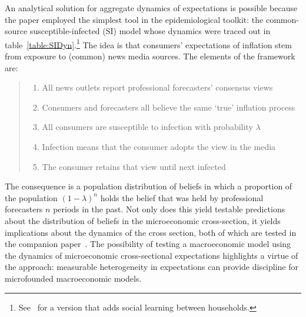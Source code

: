 
An analytical solution for aggregate dynamics of expectations is possible because the paper employed the simplest tool in the epidemiological toolkit: the common-source susceptible-infected (SI) model whose dynamics were traced out in table~\ref{table:SIDyn}.\footnote{See~\cite{easaw2015households} for a version that adds social learning between households.}   The idea is that consumers' expectations of inflation stem from exposure to (common) news media sources.  The elements of the framework are:
\begin{quote}
    \normalfont
\begin{enumerate}
    \item All news outlets report professional forecasters' consensus views
    \item Consumers and forecasters all believe the same `true' inflation process
    \item All consumers are susceptible to infection with probability $\lambda$
    \item Infection means that the consumer adopts the view in the media
    \item The consumer retains that view until next infected
\end{enumerate}
\end{quote}

The consequence is a population distribution of beliefs in which a proportion of the population $(1-\lambda)^{n}$ holds the belief that was held by professional forecasters $n$ periods in the past.  Not only does this yield testable predictions about the distribution of beliefs in the microeconomic cross-section, it yields implications about the dynamics of the cross section, both of which are tested in the companion paper~\cite{carrollEpidemiologySFI}.  The possibility of testing a macroeconomic model using the dynamics of microeconomic cross-sectional expectations highlights a virtue of the approach:  measurable heterogeneity in expectations can provide discipline for microfounded macroeconomic models.

